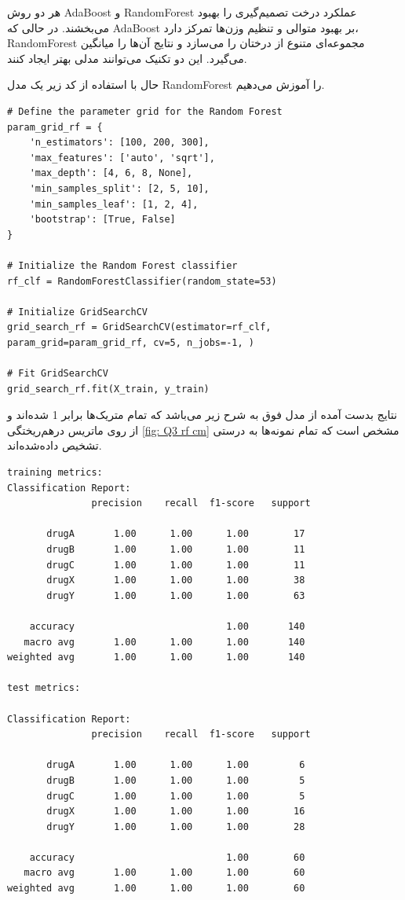 \documentclass{article}
\begin{document}
هر دو روش AdaBoost و RandomForest عملکرد درخت تصمیم‌گیری را بهبود می‌بخشند. در حالی که AdaBoost بر بهبود متوالی و تنظیم وزن‌ها تمرکز دارد، RandomForest مجموعه‌ای متنوع از درختان را می‌سازد و نتایج آن‌ها را میانگین می‌گیرد. این دو تکنیک می‌توانند مدلی بهتر ایجاد کنند.
\cite{geeksforgeeks2023differences}

حال با استفاده از کد زیر یک مدل
RandomForest
را آموزش می‌دهیم.


\begin{LTR}
\begin{verbatim}
# Define the parameter grid for the Random Forest
param_grid_rf = {
    'n_estimators': [100, 200, 300],
    'max_features': ['auto', 'sqrt'],
    'max_depth': [4, 6, 8, None],
    'min_samples_split': [2, 5, 10],
    'min_samples_leaf': [1, 2, 4],
    'bootstrap': [True, False]
}

# Initialize the Random Forest classifier
rf_clf = RandomForestClassifier(random_state=53)

# Initialize GridSearchCV
grid_search_rf = GridSearchCV(estimator=rf_clf, param_grid=param_grid_rf, cv=5, n_jobs=-1, )

# Fit GridSearchCV
grid_search_rf.fit(X_train, y_train)

\end{verbatim}
\end{LTR}

نتایج بدست آمده از مدل فوق به شرح زیر می‌باشد که تمام متریک‌ها برابر 1 شده‌اند و از روی ماتریس درهم‌ریختگی 
\autoref{fig: Q3 rf cm}
 مشخص است که تمام نمونه‌ها به درستی تشخیص داده‌شده‌اند.


\begin{LTR}
\begin{verbatim}
training metrics:
Classification Report:
               precision    recall  f1-score   support

       drugA       1.00      1.00      1.00        17
       drugB       1.00      1.00      1.00        11
       drugC       1.00      1.00      1.00        11
       drugX       1.00      1.00      1.00        38
       drugY       1.00      1.00      1.00        63

    accuracy                           1.00       140
   macro avg       1.00      1.00      1.00       140
weighted avg       1.00      1.00      1.00       140

test metrics:

Classification Report:
               precision    recall  f1-score   support

       drugA       1.00      1.00      1.00         6
       drugB       1.00      1.00      1.00         5
       drugC       1.00      1.00      1.00         5
       drugX       1.00      1.00      1.00        16
       drugY       1.00      1.00      1.00        28

    accuracy                           1.00        60
   macro avg       1.00      1.00      1.00        60
weighted avg       1.00      1.00      1.00        60
\end{verbatim}
\end{LTR}
\end{document}
